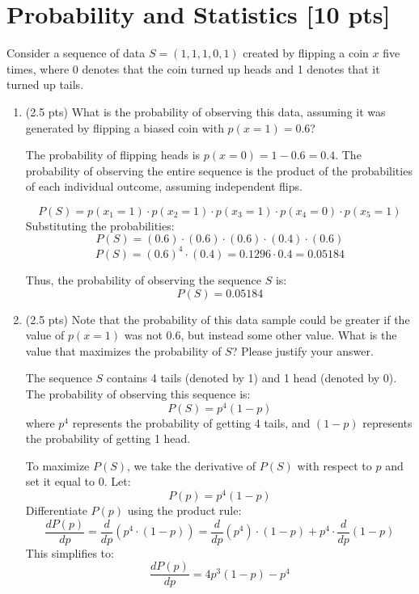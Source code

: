 \documentclass[letter]{article}
\theoremstyle{definition}
\newenvironment{soln}{
	\leavevmode\color{black}\ignorespaces
}{}
\begin{document}
	\section{Probability and Statistics [10 pts]}
	Consider a sequence of data $S = (1, 1, 1, 0, 1)$ created by flipping a coin $x$ five times, where 0 denotes that the coin turned up heads and 1 denotes that it turned up tails.
	\begin{enumerate}
		\item 	(2.5 pts) What is the probability of observing this data, assuming it was generated by flipping a biased coin with $p(x=1) = 0.6$?
		
		\begin{soln}
            The probability of flipping heads is $p(x=0) = 1 - 0.6 = 0.4$. The probability of observing the entire sequence is the product of the probabilities of each individual outcome, assuming independent flips.
            
            
            \[
            P(S) = p(x_1=1) \cdot p(x_2=1) \cdot p(x_3=1) \cdot p(x_4=0) \cdot p(x_5=1)
            \]
            Substituting the probabilities:
            \[
            P(S) = (0.6) \cdot (0.6) \cdot (0.6) \cdot (0.4) \cdot (0.6)
            \]
            \[
            P(S) = (0.6)^4 \cdot (0.4) = 0.1296 \cdot 0.4 = 0.05184
            \]
            
            Thus, the probability of observing the sequence $S$ is:
            \[
            P(S) = 0.05184
            \]
            \end{soln}
		
    		\item 	(2.5 pts) Note that the probability of this data sample could be greater if the value of $p(x = 1)$ was not $0.6$, but instead some other value. What is the value that maximizes the probability of $S$? Please justify your answer.\\

		\begin{soln}
            The sequence $S$ contains 4 tails (denoted by 1) and 1 head (denoted by 0). The probability of observing this sequence is:
            \[
            P(S) = p^4 (1 - p)
            \]
            where $p^4$ represents the probability of getting 4 tails, and $(1 - p)$ represents the probability of getting 1 head.
            
            To maximize $P(S)$, we take the derivative of $P(S)$ with respect to $p$ and set it equal to 0. Let:
            \[
            P(p) = p^4 (1 - p)
            \]
            Differentiate $P(p)$ using the product rule:
            \[
            \frac{dP(p)}{dp} = \frac{d}{dp} \left( p^4 \cdot (1 - p) \right) = \frac{d}{dp} \left( p^4 \right) \cdot (1 - p) + p^4 \cdot \frac{d}{dp} (1 - p)
            \]
            This simplifies to:
            \[
            \frac{dP(p)}{dp} = 4p^3 (1 - p) - p^4
            \]
            

\end{soln}
\end{enumerate}
\end{document}
